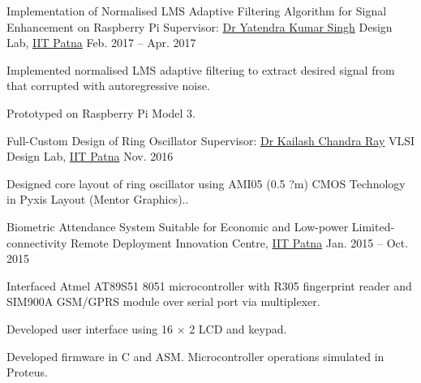 
\begin{cvprojects}

\cvproject
	{Implementation of Normalised LMS Adaptive Filtering Algorithm for Signal Enhancement on Raspberry Pi} %
	{Supervisor: \href{https://www.iitp.ac.in/index.php/departments/engineering/electrical-engineering/people/faculty/dr-yatendra-kumar-singh.html}{Dr Yatendra Kumar Singh}} %
	{Design Lab, \href{https://www.iitp.ac.in}{IIT Patna}} %
	{Feb. 2017 -- Apr. 2017} %
	{\begin{cvitems} %
		\item {Implemented normalised LMS adaptive filtering to extract desired signal from that corrupted with autoregressive noise.}
		\item {Prototyped on Raspberry Pi Model 3.}
	\end{cvitems}}

\cvproject
	{Full-Custom Design of Ring Oscillator} %
	{Supervisor: \href{https://www.iitp.ac.in/index.php/departments/engineering/electrical-engineering/people/faculty/dr-kailash-chandra-ray.html}{Dr Kailash Chandra Ray}} %
	{VLSI Design Lab, \href{https://www.iitp.ac.in}{IIT Patna}} %
	{Nov. 2016} %
	{\begin{cvitems} %
		\item {Designed core layout of ring oscillator using AMI05 (0.5 ?m) CMOS Technology in Pyxis Layout (Mentor Graphics)..}
	\end{cvitems}}

\cvproject
	{Biometric Attendance System Suitable for Economic and Low-power Limited-connectivity Remote Deployment} %
	{} %
	{Innovation Centre, \href{https://www.iitp.ac.in}{IIT Patna}} %
	{Jan. 2015 -- Oct. 2015} %
	{\begin{cvitems} %
		\item {Interfaced Atmel AT89S51 8051 microcontroller with R305 fingerprint reader and SIM900A GSM/GPRS module over serial port via multiplexer.}
		\item {Developed user interface using 16 $\times$ 2 LCD and keypad.}
		\item {Developed firmware in C and ASM. Microcontroller operations simulated in Proteus.}
	\end{cvitems}}

\end{cvprojects}
